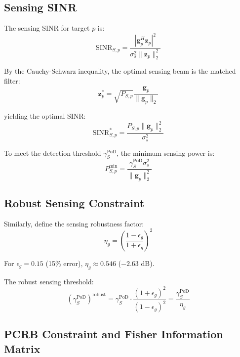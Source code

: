 \documentclass[12pt,a4paper]{article}
\newcommand{\vect}[1]{\mathbf{#1}}
\newcommand{\norm}[1]{\|#1\|_2}
\begin{document}
\subsection{Sensing SINR}

The sensing SINR for target $p$ is:
\begin{equation}
\text{SINR}_{S,p} = \frac{|\vect{g}_p^H \vect{z}_p|^2}{\sigma_s^2 \norm{\vect{z}_p}^2} \tag{5}
\end{equation}

By the Cauchy-Schwarz inequality, the optimal sensing beam is the matched filter:
\begin{equation}
\vect{z}_p^* = \sqrt{P_{S,p}} \frac{\vect{g}_p}{\norm{\vect{g}_p}} \tag{6}
\end{equation}

yielding the optimal SINR:
\begin{equation}
\text{SINR}_{S,p}^* = \frac{P_{S,p} \norm{\vect{g}_p}^2}{\sigma_s^2} \tag{7}
\end{equation}

To meet the detection threshold $\gamma_S^{\text{PoD}}$, the minimum sensing power is:
\begin{equation}
P_{S,p}^{\min} = \frac{\gamma_S^{\text{PoD}} \sigma_s^2}{\norm{\vect{g}_p}^2} \tag{8}
\end{equation}

\subsection{Robust Sensing Constraint}

Similarly, define the sensing robustness factor:
\begin{equation}
\eta_g = \left(\frac{1-\epsilon_g}{1+\epsilon_g}\right)^2 \tag{9}
\end{equation}

For $\epsilon_g = 0.15$ (15\% error), $\eta_g \approx 0.546$ ($-2.63$ dB).

The robust sensing threshold:
\begin{equation}
(\gamma_S^{\text{PoD}})^{\text{robust}} = \gamma_S^{\text{PoD}} \cdot \frac{(1+\epsilon_g)^2}{(1-\epsilon_g)^2} = \frac{\gamma_S^{\text{PoD}}}{\eta_g} \tag{10}
\end{equation}

\subsection{PCRB Constraint and Fisher Information Matrix}
\end{document}

